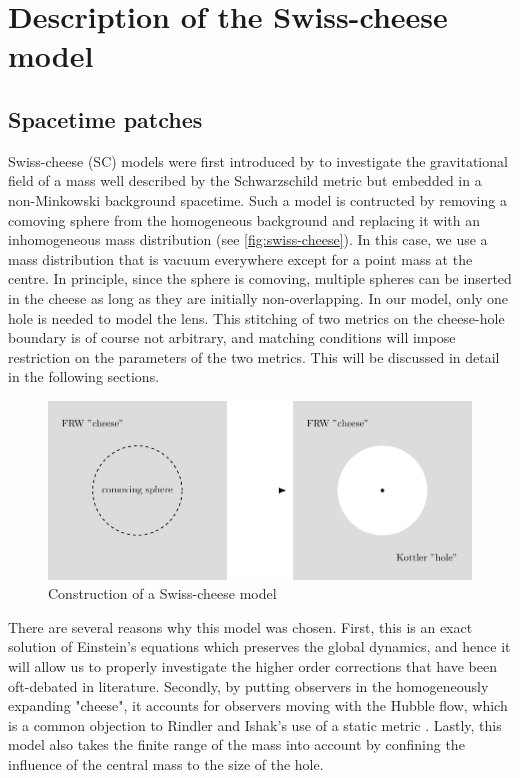 \chapter{Description of the Swiss-cheese model}
\label{chapter:swiss-cheese}

\section{Spacetime patches}

Swiss-cheese (SC) models were first introduced by \citet{einstein1945influence} to investigate the gravitational field of a mass well described by the Schwarzschild metric but embedded in a non-Minkowski background spacetime. Such a model is contructed by removing a comoving sphere from the homogeneous background and replacing it with an inhomogeneous mass distribution (see \autoref{fig:swiss-cheese}). In this case, we use a mass distribution that is vacuum everywhere except for a point mass at the centre. In principle, since the sphere is comoving, multiple spheres can be inserted in the cheese as long as they are initially non-overlapping. In our model, only one hole is needed to model the lens. This stitching of two metrics on the cheese-hole boundary is of course not arbitrary, and matching conditions will impose restriction on the parameters of the two metrics. This will be discussed in detail in the following sections. 

\begin{figure}
  \centering
  \includegraphics[height=0.3\linewidth]{images/swiss-cheese.pdf}
  \caption{Construction of a Swiss-cheese model}
  \label{fig:swiss-cheese}
\end{figure}

There are several reasons why this model was chosen. First, this is an exact solution of Einstein's equations which preserves the global dynamics, and hence it will allow us to properly investigate the higher order corrections that have been oft-debated in literature. Secondly, by putting observers in the homogeneously expanding "cheese", it accounts for observers moving with the Hubble flow, which is a common objection to Rindler and Ishak's use of a static metric \citep{park2008rigorous,khriplovich2008does,simpson2010lensing,butcher2016no}. Lastly, this model also takes the finite range of the mass into account by confining the influence of the central mass to the size of the hole. 

